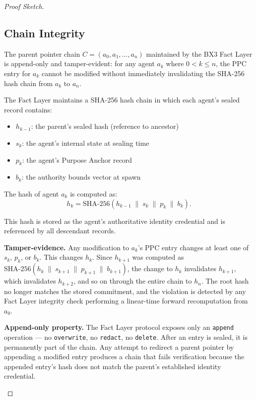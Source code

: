 \begin{proof}[Proof Sketch]
\subsection{Chain Integrity}

\begin{theorem}\label{th:chain-integrity}
The parent pointer chain $C = (a_0, a_1, \ldots, a_n)$ maintained by the BX3 Fact Layer is append-only and tamper-evident: for any agent $a_k$ where $0 < k \leq n$, the PPC entry for $a_k$ cannot be modified without immediately invalidating the SHA-256 hash chain from $a_k$ to $a_n$.
\end{theorem}

\begin{Proof}
The Fact Layer maintains a SHA-256 hash chain in which each agent's sealed record contains:
\begin{itemize}
  \item $h_{k-1}$: the parent's sealed hash (reference to ancestor)
  \item $s_k$: the agent's internal state at sealing time
  \item $p_k$: the agent's Purpose Anchor record
  \item $b_k$: the authority bounds vector at spawn
\end{itemize}

The hash of agent $a_k$ is computed as:
\begin{equation}
h_k = \mathrm{SHA\text{-}256}(h_{k-1} \;\|\; s_k \;\|\; p_k \;\|\; b_k).
\label{eq:chain-hash-computation}
\end{equation}

This hash is stored as the agent's authoritative identity credential and is referenced by all descendant records.

\bigskip
\noindent\textbf{Tamper-evidence.} Any modification to $a_k$'s PPC entry changes at least one of $s_k$, $p_k$, or $b_k$. This changes $h_k$. Since $h_{k+1}$ was computed as $\mathrm{SHA\text{-}256}(h_k \;\|\; s_{k+1} \;\|\; p_{k+1} \;\|\; b_{k+1})$, the change to $h_k$ invalidates $h_{k+1}$, which invalidates $h_{k+2}$, and so on through the entire chain to $h_n$. The root hash no longer matches the stored commitment, and the violation is detected by any Fact Layer integrity check performing a linear-time forward recomputation from $a_0$.

\bigskip
\noindent\textbf{Append-only property.} The Fact Layer protocol exposes only an \texttt{append} operation — no \texttt{overwrite}, no \texttt{redact}, no \texttt{delete}. After an entry is sealed, it is permanently part of the chain. Any attempt to redirect a parent pointer by appending a modified entry produces a chain that fails verification because the appended entry's hash does not match the parent's established identity credential.


\end{Proof}
\end{proof}
